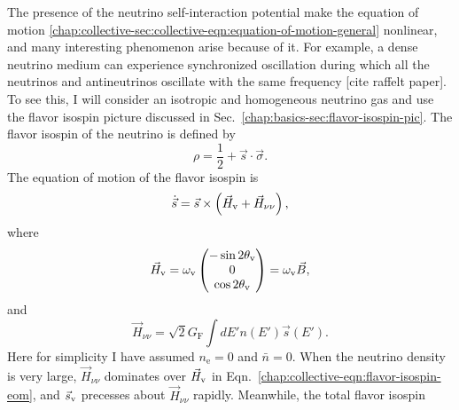 The presence of the neutrino self-interaction potential make the equation of motion \ref{chap:collective-sec:collective-eqn:equation-of-motion-general} nonlinear, and many interesting phenomenon arise because of it. For example, a dense neutrino medium can experience synchronized oscillation during which all the neutrinos and antineutrinos oscillate with the same frequency [cite raffelt paper]. To see this, I will consider an isotropic and homogeneous neutrino gas and use the flavor isospin picture discussed in Sec.~\ref{chap:basics-sec:flavor-isospin-pic}. The flavor isospin of the neutrino is defined by
\begin{equation}
   \rho = \frac{1}{2} + \vec s \cdot \vec \sigma.
\end{equation}
The equation of motion of the flavor isospin is
\begin{equation}
    \dot{\vec s} = \vec s \times \left(\vec H_\vv + \vec H_{\nu\nu} \right),
    \label{chap:collective-eqn:flavor-isospin-eom}
\end{equation}
where
\begin{equation}
   \vec H_{\mathrm v} =  \omega_{\mathrm v}\begin{pmatrix}
   -\sin 2\theta_{\mathrm v}\\
   0 \\
   \cos 2\theta_{\mathrm v}
   \end{pmatrix} = \omega_\mathrm v \vec B,
\end{equation}
and
\begin{equation}
\vec H_{\nu\nu} = \sqrt{2}G_{\mathrm F} \int d E' n(E') \vec s(E').
\end{equation}
Here for simplicity I have assumed $n_{\mathrm e}=0$ and $\bar n=0$. When the neutrino density is very large, $\vec H_{\nu\nu}$ dominates over $\vec H_\mathrm v$ in Eqn.~\ref{chap:collective-eqn:flavor-isospin-eom}, and $\vec s_\mathrm v$ precesses about $\vec H_{\nu\nu}$ rapidly. Meanwhile, the total flavor isospin
